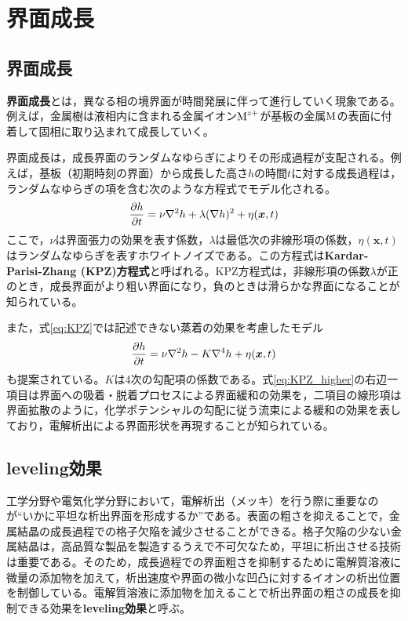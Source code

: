 \documentclass[autodetect-engine,dvi=dvipdfmx,a4paper,ja=standard,oneside,openany,11pt]{bxjsbook}
\begin{document}
\section{界面成長}
\subsection{界面成長}
\textbf{界面成長}とは，異なる相の境界面が時間発展に伴って進行していく現象である。例えば，金属樹は液相内に含まれる金属イオン$\ce{M^{z+}}$が基板の金属$\ce{M}$の表面に付着して固相に取り込まれて成長していく。

界面成長は，成長界面のランダムなゆらぎによりその形成過程が支配される。例えば，基板（初期時刻の界面）から成長した高さ$h$の時間$t$に対する成長過程は，ランダムなゆらぎの項を含む次のような方程式でモデル化される\cite{kardar1986dynamic}。
\begin{equation}
  \pdv{h}{t}=\nu\nabla^2h+\lambda(\nabla h)^2+\eta(\bm{x},t)
  \label{eq:KPZ}
\end{equation}
ここで，$\nu$は界面張力の効果を表す係数，$\lambda$は最低次の非線形項の係数，$\eta(\bm{x},t)$はランダムなゆらぎを表すホワイトノイズである。この方程式は\textbf{Kardar-Parisi-Zhang (KPZ)方程式}と呼ばれる。KPZ方程式は，非線形項の係数$\lambda$が正のとき，成長界面がより粗い界面になり，負のときは滑らかな界面になることが知られている。

また，式\eqref{eq:KPZ}では記述できない蒸着の効果を考慮したモデル\cite{wolf1990growth}
\begin{equation}
  \pdv{h}{t}=\nu\nabla^2h-K\nabla^4h+\eta(\bm{x},t)
  \label{eq:KPZ_higher}
\end{equation}
も提案されている。$K$は4次の勾配項の係数である。式\eqref{eq:KPZ_higher}の右辺一項目は界面への吸着・脱着プロセスによる界面緩和の効果を，二項目の線形項は界面拡散のように，化学ポテンシャルの勾配に従う流束による緩和の効果を表しており，電解析出による界面形状を再現することが知られている。

\subsection{leveling効果}
工学分野や電気化学分野において，電解析出（メッキ）を行う際に重要なのが``いかに平坦な析出界面を形成するか''である。表面の粗さを抑えることで，金属結晶の成長過程での格子欠陥を減少させることができる。格子欠陥の少ない金属結晶は，高品質な製品を製造するうえで不可欠なため，平坦に析出させる技術は重要である。そのため，成長過程での界面粗さを抑制するために電解質溶液に微量の添加物を加えて，析出速度や界面の微小な凹凸に対するイオンの析出位置を制御している。電解質溶液に添加物を加えることで析出界面の粗さの成長を抑制できる効果を\textbf{leveling効果}と呼ぶ。
\end{document}
